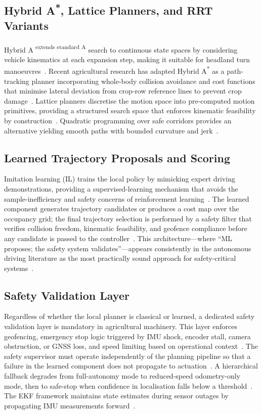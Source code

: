 \documentclass[12pt, a4paper]{article}
\begin{document}
\subsection{Hybrid A\textsuperscript{*}, Lattice Planners, and RRT Variants}

Hybrid A\textsuperscript{\textit{} extends standard A\textsuperscript{}} search to continuous
state spaces by considering vehicle kinematics at each expansion step, making it suitable
for headland turn manoeuvres~\cite{ref118, ref122, ref138}. Recent agricultural research has
adapted Hybrid A\textsuperscript{*} as a path-tracking planner incorporating whole-body
collision avoidance and cost functions that minimise lateral deviation from crop-row
reference lines to prevent crop damage~\cite{ref103, ref105}. Lattice planners discretise
the motion space into pre-computed motion primitives, providing a structured search space
that enforces kinematic feasibility by construction~\cite{ref118}. Quadratic programming
over safe corridors provides an alternative yielding smooth paths with bounded curvature
and jerk~\cite{ref106}.

\subsection{Learned Trajectory Proposals and Scoring}

Imitation learning (IL) trains the local policy by mimicking expert driving demonstrations,
providing a supervised-learning mechanism that avoids the sample-inefficiency and safety
concerns of reinforcement learning~\cite{ref102, ref129}. The learned component generates
trajectory candidates or produces a cost map over the occupancy grid; the final trajectory
selection is performed by a safety filter that verifies collision freedom, kinematic
feasibility, and geofence compliance before any candidate is passed to the
controller~\cite{ref129, ref130}. This architecture---where ``ML proposes; the safety
system validates''---appears consistently in the autonomous driving literature as the most
practically sound approach for safety-critical systems~\cite{ref2, ref129, ref130}.

\subsection{Safety Validation Layer}

Regardless of whether the local planner is classical or learned, a dedicated safety
validation layer is mandatory in agricultural machinery. This layer enforces geofencing,
emergency stop logic triggered by IMU shock, encoder stall, camera obstruction, or GNSS
loss, and speed limiting based on operational context~\cite{ref2}. The safety supervisor
must operate independently of the planning pipeline so that a failure in the learned
component does not propagate to actuation~\cite{ref2}. A hierarchical fallback degrades
from full-autonomy mode to reduced-speed odometry-only mode, then to safe-stop when
confidence in localisation falls below a threshold~\cite{ref2}. The EKF framework
maintains state estimates during sensor outages by propagating IMU measurements
forward~\cite{ref85, ref87, ref93}.
\end{document}
